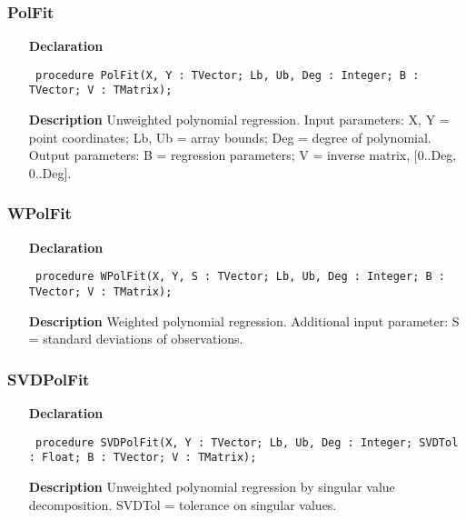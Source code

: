 \documentclass[12pt,a4paper,oneside]{report}
\newcommand{\declarationitem}[1]{\textbf{#1}}
\newcommand{\descriptiontitle}[1]{\textbf{#1}}
\newcommand{\code}[1]{\texttt{#1}}
\begin{document}
\subsubsection{PolFit}
\label{upolfit-PolFit}
\begin{itemize}\item[\declarationitem{Declaration}\hfill]
	\begin{flushleft}
		\code{
			procedure PolFit(X, Y : TVector; Lb, Ub, Deg : Integer; B : TVector; V : TMatrix);}
		
	\end{flushleft}
	
	\par
	\item[\descriptiontitle{Description}]
	Unweighted polynomial regression. Input parameters: X, Y = point coordinates; Lb, Ub = array bounds; Deg = degree of polynomial. Output parameters: B = regression parameters; V = inverse matrix, [0..Deg, 0..Deg].
	
\end{itemize}
\subsubsection{WPolFit}
\label{upolfit-WPolFit}
\begin{itemize}\item[\declarationitem{Declaration}\hfill]
	\begin{flushleft}
		\code{
			procedure WPolFit(X, Y, S : TVector; Lb, Ub, Deg : Integer; B : TVector; V : TMatrix);}
		
	\end{flushleft}
	
	\par
	\item[\descriptiontitle{Description}]
	Weighted polynomial regression. Additional input parameter: S = standard deviations of observations.
	
\end{itemize}
\subsubsection{SVDPolFit}
\label{upolfit-SVDPolFit}
\begin{itemize}\item[\declarationitem{Declaration}\hfill]
	\begin{flushleft}
		\code{
			procedure SVDPolFit(X, Y : TVector; Lb, Ub, Deg : Integer; SVDTol : Float; B : TVector; V : TMatrix);}
		
	\end{flushleft}
	
	\par
	\item[\descriptiontitle{Description}]
	Unweighted polynomial regression by singular value decomposition. SVDTol = tolerance on singular values.
	
\end{itemize}
\end{document}
